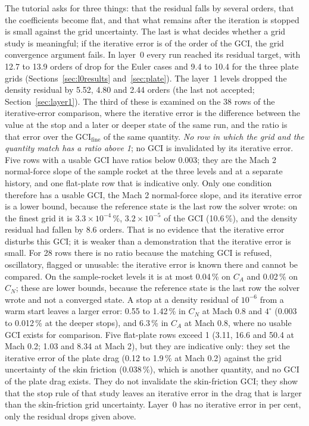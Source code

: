 \documentclass[11pt,a4paper]{article}
\newcommand{\fine}{\mathrm{fine}}
\begin{document}
The tutorial asks for three things: that the residual falls by several orders, that the coefficients become flat,
and that what remains after the iteration is stopped is small against the grid uncertainty.
The last is what decides whether a grid study is meaningful; if the iterative error is of the order of the GCI,
the grid convergence argument fails.
In layer~0 every run reached its residual target, with 12.7 to 13.9 orders of drop for the Euler cases and 9.4 to 10.4
for the three plate grids (Sections~\ref{sec:l0results} and~\ref{sec:plate}).
The layer~1 levels dropped the density residual by 5.52, 4.80 and 2.44 orders (the last not accepted; Section~\ref{sec:layer1}).
The third of these is examined on the 38 rows of the iterative-error comparison, where the iterative error is the difference between the value at the stop and
a later or deeper state of the same run, and the ratio is that error over the $\mathrm{GCI}_\fine$ of the same quantity.
\emph{No row in which the grid and the quantity match has a ratio above 1}; no GCI is invalidated by its iterative error.
Five rows with a usable GCI have ratios below 0.003; they are the Mach 2 normal-force slope of the sample rocket at the three levels and at a separate history,
and one flat-plate row that is indicative only.
Only one condition therefore has a usable GCI, the Mach 2 normal-force slope, and its iterative error is a lower bound, because the reference state is the last row the solver wrote:
on the finest grid it is $3.3\times10^{-4}\,\%$, $3.2\times10^{-5}$ of the GCI (10.6\,\%), and the density residual had fallen by 8.6 orders.
That is no evidence that the iterative error disturbs this GCI; it is weaker than a demonstration that the iterative error is small.
For 28 rows there is no ratio because the matching GCI is refused, oscillatory, flagged or unusable: the iterative error is known there and cannot be compared.
On the sample-rocket levels it is at most 0.04\,\% on $C_A$ and 0.02\,\% on $C_N$; these are lower bounds, because the reference state is the last row the solver wrote and not a converged state.
A stop at a density residual of $10^{-6}$ from a warm start leaves a larger error: 0.55 to 1.42\,\% in $C_N$ at Mach 0.8 and $4^\circ$ (0.003 to 0.012\,\% at the deeper stops),
and 6.3\,\% in $C_A$ at Mach 0.8, where no usable GCI exists for comparison.
Five flat-plate rows exceed 1 (3.11, 16.6 and 50.4 at Mach 0.2; 1.03 and 8.34 at Mach 2), but they are indicative only: they set the iterative error of the plate drag
(0.12 to 1.9\,\% at Mach 0.2) against the grid uncertainty of the skin friction (0.038\,\%), which is another quantity, and no GCI of the plate drag exists.
They do not invalidate the skin-friction GCI; they show that the stop rule of that study leaves an iterative error in the drag that is larger than the skin-friction grid uncertainty.
Layer~0 has no iterative error in per cent, only the residual drops given above.
\end{document}

